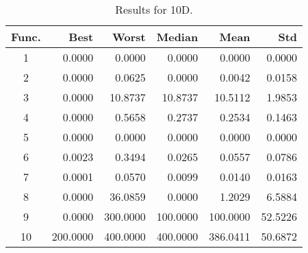 \begin{table}[ht]
\centering
\caption{ Results for 10D. }
\label{tab:10D}
\begin{tabular}{crrrrr}
\hline
{Func.} & Best & Worst & Median & Mean & Std \\
\hline
1 & 0.0000 & 0.0000 & 0.0000 & 0.0000 & 0.0000 \\
2 & 0.0000 & 0.0625 & 0.0000 & 0.0042 & 0.0158 \\
3 & 0.0000 & 10.8737 & 10.8737 & 10.5112 & 1.9853 \\
4 & 0.0000 & 0.5658 & 0.2737 & 0.2534 & 0.1463 \\
5 & 0.0000 & 0.0000 & 0.0000 & 0.0000 & 0.0000 \\
6 & 0.0023 & 0.3494 & 0.0265 & 0.0557 & 0.0786 \\
7 & 0.0001 & 0.0570 & 0.0099 & 0.0140 & 0.0163 \\
8 & 0.0000 & 36.0859 & 0.0000 & 1.2029 & 6.5884 \\
9 & 0.0000 & 300.0000 & 100.0000 & 100.0000 & 52.5226 \\
10 & 200.0000 & 400.0000 & 400.0000 & 386.0411 & 50.6872 \\
\hline
\end{tabular}
\end{table}
